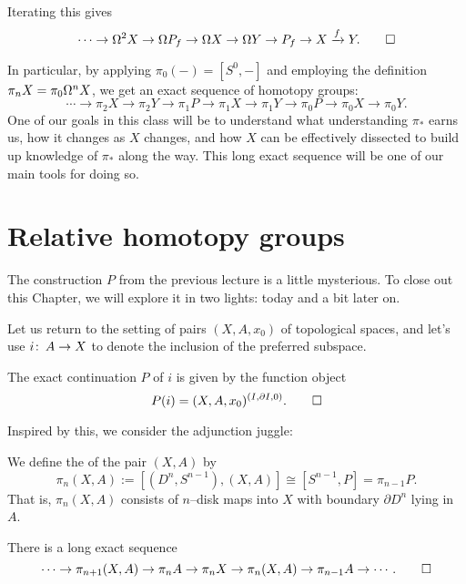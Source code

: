 \begin{lemma}\label{LexseqInvolvingP}%
Iterating this gives \[\cdots \to \Omega^2 X \to \Omega P_f \to \Omega X \to \Omega Y \to P_f \to X \xrightarrow f Y. \qed\]
\end{lemma}

In particular, by applying $\pi_0(-) = [S^0, -]$ and employing the definition $\pi_n X = \pi_0 \Omega^n X$, we get an exact sequence of homotopy groups: \[\cdots \to \pi_2 X \to \pi_2 Y \to \pi_1 P \to \pi_1 X \to \pi_1 Y \to \pi_0 P \to \pi_0 X \to \pi_0 Y.\]
One of our goals in this class will be to understand what understanding $\pi_*$ earns us, how it changes as $X$ changes, and how $X$ can be effectively dissected to build up knowledge of $\pi_*$ along the way.
This long exact sequence will be one of our main tools for doing so.




\section{Relative homotopy groups}

The construction $P$ from the previous lecture is a little mysterious.
To close out this Chapter, we will explore it in two lights: today and a bit later on.

Let us return to the setting of pairs $(X, A, x_0)$ of topological spaces, and let's use $i\colon\thinspace A \to X$ to denote the inclusion of the preferred subspace.

\begin{lemma}
The exact continuation $P$ of $i$ is given by the function object \[P(i) = (X, A, x_0)^{(I, \partial I, 0)}. \qed\]
\end{lemma}

Inspired by this, we consider the adjunction juggle:

\begin{definition}
We define the  of the pair $(X, A)$ by \[\pi_n(X, A) := [(D^n, S^{n-1}), (X, A)] \cong [S^{n-1}, P] = \pi_{n-1} P.\]
That is, $\pi_n(X, A)$ consists of $n$--disk maps into $X$ with boundary $\partial D^n$ lying in $A$.
\end{definition}

\begin{corollary}\label{LexseqOfRelativeHtpy}%
There is a long exact sequence \[\cdots \to \pi_{n+1}(X, A) \to \pi_n A \to \pi_n X \to \pi_n (X, A) \to \pi_{n-1} A \to \cdots. \qed\]
\end{corollary}

